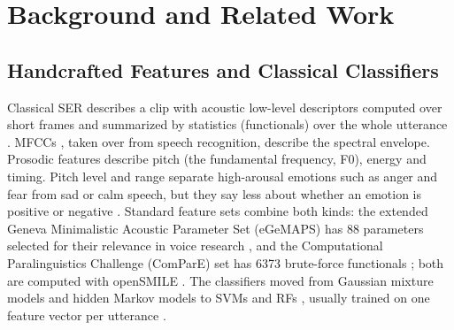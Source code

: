 \documentclass[journal]{IEEEtran}
\begin{document}
\section{Background and Related Work}
\label{sec:background}

\subsection{Handcrafted Features and Classical Classifiers}
Classical SER describes a clip with acoustic low-level descriptors computed over short frames and summarized by statistics (functionals) over the whole utterance \cite{elayadi2011survey,schuller2018ser}. MFCCs \cite{davis1980mfcc}, taken over from speech recognition, describe the spectral envelope. Prosodic features describe pitch (the fundamental frequency, F0), energy and timing. Pitch level and range separate high-arousal emotions such as anger and fear from sad or calm speech, but they say less about whether an emotion is positive or negative \cite{elayadi2011survey}. Standard feature sets combine both kinds: the extended Geneva Minimalistic Acoustic Parameter Set (eGeMAPS) has 88 parameters selected for their relevance in voice research \cite{eyben2016gemaps}, and the Computational Paralinguistics Challenge (ComParE) set has 6373 brute-force functionals \cite{schuller2016compare}; both are computed with openSMILE \cite{eyben2010opensmile}. The classifiers moved from Gaussian mixture models and hidden Markov models to SVMs \cite{cortes1995svm} and RFs \cite{breiman2001rf}, usually trained on one feature vector per utterance \cite{elayadi2011survey}.
\end{document}
